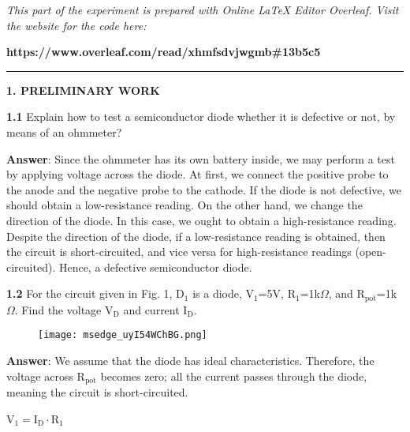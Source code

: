 \documentclass{article}
\begin{document}
\large

{\textit{This part of the experiment is prepared with Online LaTeX Editor Overleaf. Visit the website for the code here:}}

{\textbf{https://www.overleaf.com/read/xhmfsdvjwgmb\#13b5c5}}
\vspace{4mm}
\hrule
\vspace{4mm}
{\Large \textbf{1. PRELIMINARY WORK}}

\vspace{4mm} 

{\textbf{1.1} Explain how to test a semiconductor diode whether it is defective or not, by means of 
an ohmmeter?}

\vspace{4mm}

{\textbf{Answer}: Since the ohmmeter has its own battery inside, we may perform a test by applying voltage across the diode. At first, we connect the positive probe to the anode and the negative probe to the cathode. If the diode is not defective, we should obtain a low-resistance reading. On the other hand, we change the direction of the diode. In this case, we ought to obtain a high-resistance reading. Despite the direction of the diode, if a low-resistance reading is obtained, then the circuit is short-circuited, and vice versa for high-resistance readings (open-circuited). Hence, a defective semiconductor diode.}

\vspace{8mm}

{\textbf{1.2} For the circuit given in Fig. 1, D$_1$ is a diode, V$_1$=5V, R$_1$=1k$\Omega$, and R$_{\text{pot}}$=1k$\Omega$. Find the voltage V$_{\text{D}}$ and current I$_{\text{D}}$.}

\begin{figure}[H]
    \centering
    \texttt{[image: msedge\_uyI54WChBG.png]}
\end{figure}

\vspace{4mm}

{\textbf{Answer}: We assume that the diode has ideal characteristics. Therefore, the voltage across R$_\text{pot}$ becomes zero; all the current passes through the diode, meaning the circuit is short-circuited.}

\vspace{4mm}

{V$_1 = \text{I}_\text{D} \cdot \text{R}_1$}

\vspace{4mm}
\end{document}
